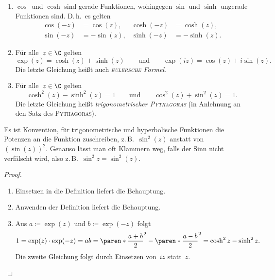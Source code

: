 \documentclass[a4paper]{article}
\begin{document}
\begin{proposition}\leavevmode
    \begin{enumerate}
        \item $\cos$~und $\cosh$ sind gerade Funktionen, wohingegen $\sin$ und $\sinh$ ungerade Funktionen sind. D.\,h.\ es gelten
              \begin{align*}
                  \cos(-z) & = \cos(z),  & \cosh(-z) & = \cosh(z),  \\
                  \sin(-z) & = -\sin(z), & \sinh(-z) & = -\sinh(z).
              \end{align*}
        \item Für alle~$z \in \C$ gelten
              \begin{equation*}
                  \exp(z) = \cosh(z)+\sinh(z) \qquad\text{und}\qquad \exp(iz) = \cos(z)+i\sin(z).
              \end{equation*}
              Die letzte Gleichung heißt auch \emph{\textsc{eulersche} Formel}.
        \item Für alle~$z \in \C$ gelten
              \begin{equation*}
                  \cosh^2(z) - \sinh^2(z) = 1 \qquad\text{und}\qquad \cos^2(z) + \sin^2(z) = 1.
              \end{equation*}
              Die letzte Gleichung heißt \emph{trigonometrischer \textsc{Pythagoras}} (in Anlehnung an den Satz des \textsc{Pythagoras}).
    \end{enumerate}
\end{proposition}

\begin{notation}
    Es ist Konvention, für trigonometrische und hyperbolische Funktionen die Potenzen an die Funktion zuschreiben, z.\,B.\ $\sin^2(z)$ anstatt von~$(\sin(z))^2$. Genauso lässt man oft Klammern weg, falls der Sinn nicht verfälscht wird, also z.\,B.\ $\sin^2 z = \sin^2(z)$.
\end{notation}

\begin{proof}\leavevmode
    \begin{enumerate}
        \item Einsetzen in die Definition liefert die Behauptung.
        \item Anwenden der Definition liefert die Behauptung.
        \item Aus $a \coloneqq \exp(z)$ und $b \coloneqq \exp(-z)$ folgt
              \begin{equation*}
                  1 = \exp(z)\cdot\exp(-z) = ab = \paren*{\frac{a+b}{2}}^2 - \paren*{\frac{a-b}{2}}^2 = \cosh^2z-\sinh^2z.
              \end{equation*}
              Die zweite Gleichung folgt durch Einsetzen von~$iz$ statt~$z$.\qedhere
    \end{enumerate}
\end{proof}
\end{document}
